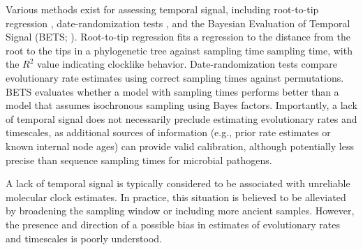 \documentclass[11pt]{article}
\begin{document}
Various methods exist for assessing temporal signal, including root-to-tip regression \citep{buonagurio1986evolution, gojobori1990molecular, drummond2003inference}, date-randomization tests \citep{ramsden2009hantavirus, duchene2015performance, duchene2018inferring, trovao2015host}, and the Bayesian Evaluation of Temporal Signal (BETS; \cite{duchene2020bayesian}). Root-to-tip regression fits a regression to the distance from the root to the tips in a phylogenetic tree against sampling time sampling time, with the $R^2$ value indicating clocklike behavior. Date-randomization tests compare evolutionary rate estimates using correct sampling times against permutations. BETS evaluates whether a model with sampling times performs better than a model that assumes isochronous sampling using Bayes factors. Importantly, a lack of temporal signal does not necessarily preclude estimating evolutionary rates and timescales, as additional sources of information (e.g., prior rate estimates or known internal node ages) can provide valid calibration, although potentially less precise than sequence sampling times for microbial pathogens.

A lack of temporal signal is typically considered to be associated with unreliable molecular clock estimates. In practice, this situation is believed to be alleviated by broadening the sampling window or including more ancient samples. However, the presence and direction of a possible bias in estimates of evolutionary rates and timescales is poorly understood. 



\end{document}
